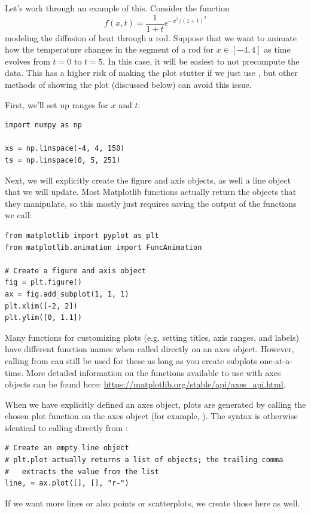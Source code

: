\noindent
Let's work through an example of this.
Consider the function
\begin{equation*}
f(x,t) = \frac{1}{1+t}e^{-x^2/(1+t)^2}
\end{equation*}
modeling the diffusion of heat through a rod.
Suppose that we want to animate how the temperature changes in the segment of a rod for $x\in [-4,4]$ as time evolves from $t=0$ to $t=5$.
In this case, it will be easiest to not precompute the data.
This has a higher risk of making the plot stutter if we just use , but other methods of showing the plot (discussed below) can avoid this issue.

First, we'll set up ranges for $x$ and $t$:
\begin{lstlisting}
import numpy as np

xs = np.linspace(-4, 4, 150)
ts = np.linspace(0, 5, 251)
\end{lstlisting}

Next, we will explicitly create the figure and axis objects, as well a line object that we will update.
Most Matplotlib functions actually return the objects that they manipulate, so this mostly just requires saving the output of the functions we call:
\begin{lstlisting}
from matplotlib import pyplot as plt
from matplotlib.animation import FuncAnimation

# Create a figure and axis object
fig = plt.figure()
ax = fig.add_subplot(1, 1, 1)
plt.xlim([-2, 2])
plt.ylim([0, 1.1])
\end{lstlisting}
\begin{info}
Many functions for customizing plots (e.g. setting titles, axis ranges, and labels) have different function names when called directly on an axes object.
However, calling from  can still be used for these as long as you create subplots one-at-a-time.
More detailed information on the functions available to use with axes objects can be found here: \url{https://matplotlib.org/stable/api/axes\_api.html}.
\end{info}
When we have explicitly defined an axes object, plots are generated by calling the chosen plot function on the axes object (for example, ).
The syntax is otherwise identical to calling directly from :
\begin{lstlisting}
# Create an empty line object
# plt.plot actually returns a list of objects; the trailing comma
#   extracts the value from the list
line, = ax.plot([], [], "r-")
\end{lstlisting}
If we want more lines or also points or scatterplots, we create those here as well.

